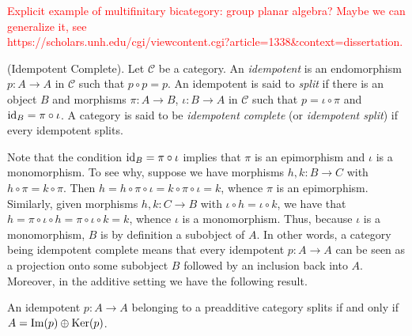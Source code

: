 \noindent\textcolor{red}{Explicit example of multifinitary bicategory: group planar algebra? Maybe we can generalize it, see\\ https://scholars.unh.edu/cgi/viewcontent.cgi?article=1338\&context=dissertation.}\newpage

\noindent\begin{definition}\textup{(Idempotent Complete).} Let $\mathcal{C}$ be a category. An {\em idempotent} is an endomorphism $p : A \to A$ in $\mathcal{C}$ such that $p \circ p = p$. An idempotent is said to {\em split} if there is an object $B$ and morphisms $\pi : A \to B$, $\iota : B \to A$ in $\mathcal{C}$ such that $p = \iota \circ \pi$ and $\textup{id}_B = \pi \circ \iota$. A category is said to be {\em idempotent complete} (or {\em idempotent split}) if every idempotent splits.\\
\end{definition}

\noindent Note that the condition $\textup{id}_B = \pi \circ \iota$ implies that $\pi$ is an epimorphism and $\iota$ is a monomorphism. To see why, suppose we have morphisms $h, k : B \to C$ with $h \circ \pi = k \circ \pi$. Then $h = h \circ \pi \circ \iota = k \circ \pi \circ \iota = k$, whence $\pi$ is an epimorphism. Similarly, given morphisms $h, k : C \to B$ with $\iota \circ h = \iota \circ k$, we have that $h = \pi \circ \iota \circ h = \pi \circ \iota \circ k = k$, whence $\iota$ is a monomorphism. Thus, because $\iota$ is a monomorphism, $B$ is by definition a subobject of $A$. In other words, a category being idempotent complete means that every idempotent $p : A \to A$ can be seen as a projection onto some subobject $B$ followed by an inclusion back into $A$. Moreover, in the additive setting we have the following result.\\

\noindent\begin{proposition} An idempotent $p : A \to A$ belonging to a preadditive category splits if and only if $A = \textup{Im}(p) \oplus \textup{Ker}(p)$.\\
\end{proposition}

